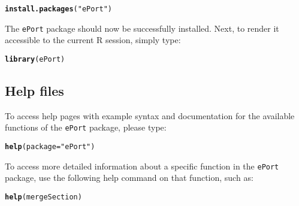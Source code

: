 \documentclass{article}\usepackage[]{graphicx}\usepackage[]{color}
\makeatletter
\newcommand{\hlstr}[1]{\textcolor[rgb]{0.192,0.494,0.8}{#1}}%
\newcommand{\hlstd}[1]{\textcolor[rgb]{0.345,0.345,0.345}{#1}}%
\newcommand{\hlkwc}[1]{\textcolor[rgb]{0.333,0.667,0.333}{#1}}%
\newcommand{\hlkwd}[1]{\textcolor[rgb]{0.737,0.353,0.396}{\textbf{#1}}}%
\newenvironment{kframe}{%
 \def\at@end@of@kframe{}%
 \ifinner\ifhmode%
  \def\at@end@of@kframe{\end{minipage}}%
  \begin{minipage}{\columnwidth}%
 \fi\fi%
 \def\FrameCommand##1{\hskip\@totalleftmargin \hskip-\fboxsep
 \colorbox{shadecolor}{##1}\hskip-\fboxsep
     \hskip-\linewidth \hskip-\@totalleftmargin \hskip\columnwidth}%
 \MakeFramed {\advance\hsize-\width
   \@totalleftmargin\z@ \linewidth\hsize
   \@setminipage}}%
 {\par\unskip\endMakeFramed%
 \at@end@of@kframe}
\newenvironment{knitrout}{}{} %
\numberwithin{equation}{section} %
\newcommand{\pkg}[1]{{\texttt{#1}}}
\newcommand{\R}{{\normalfont\textsf{R }}{}}
\makeatother
\begin{document}
\begin{knitrout}
\color{fgcolor}\begin{kframe}
\begin{alltt}
\hlkwd{install.packages}\hlstd{(}\hlstr{"ePort"}\hlstd{)}
\end{alltt}
\end{kframe}
\end{knitrout}

\noindent
The \pkg{ePort} package should now be successfully installed. Next, to render it accessible to the current \R session, simply type:

\begin{knitrout}
\color{fgcolor}\begin{kframe}
\begin{alltt}
\hlkwd{library}\hlstd{(ePort)}
\end{alltt}
\end{kframe}
\end{knitrout}

\subsection{Help files}

To access help pages with example syntax and documentation for the available functions of the \pkg{ePort} package, please type:

\begin{knitrout}
\color{fgcolor}\begin{kframe}
\begin{alltt}
\hlkwd{help}\hlstd{(}\hlkwc{package}\hlstd{=}\hlstr{"ePort"}\hlstd{)}
\end{alltt}
\end{kframe}
\end{knitrout}

To access more detailed information about a specific function in the \pkg{ePort} package, use the following help command on that function, such as:

\begin{knitrout}
\color{fgcolor}\begin{kframe}
\begin{alltt}
\hlkwd{help}\hlstd{(mergeSection)}
\end{alltt}
\end{kframe}
\end{knitrout}
\end{document}
